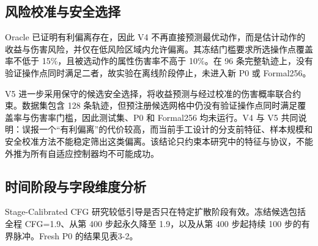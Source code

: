 \subsection{风险校准与安全选择}

Oracle 已证明有利偏离存在，因此 V4 不再直接预测最优动作，而是估计动作的收益与伤害风险，并仅在低风险区域内允许偏离。其冻结门槛要求所选操作点覆盖率不低于 15\%，且被选动作的属性伤害率不高于 10\%。在 96 条完整轨迹上，没有验证操作点同时满足二者，故实验在离线阶段停止，未进入新 P0 或 Formal256。

V5 进一步采用保守的候选安全选择，将收益预测与经过校准的伤害概率联合约束。数据集包含 128 条轨迹，但预注册候选网格中仍没有验证操作点同时满足覆盖率与伤害率门槛，因此测试集、P0 和 Formal256 均未运行。V4 与 V5 共同说明：误报一个``有利偏离''的代价较高，而当前手工设计的分支前特征、样本规模和安全校准方法不能稳定筛出这类偏离。该结论只约束本研究中的特征与协议，不能外推为所有自适应控制器均不可能成功。

\subsection{时间阶段与字段维度分析}

Stage-Calibrated CFG 研究较低引导是否只在特定扩散阶段有效。冻结候选包括全程 CFG=1.9、从第 400 步起永久降至 1.9，以及从第 400 步起持续 100 步的有界脉冲。Fresh P0 的结果见表3-2。


